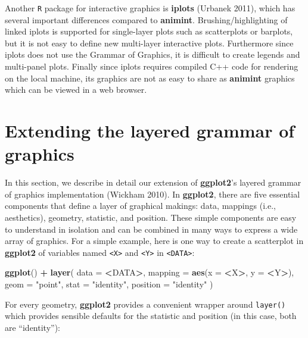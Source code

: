 \documentclass[12pt,]{article}
\newenvironment{Shaded}{\begin{snugshade}}{\end{snugshade}}
\newcommand{\DataTypeTok}[1]{\textcolor[rgb]{0.13,0.29,0.53}{#1}}
\newcommand{\KeywordTok}[1]{\textcolor[rgb]{0.13,0.29,0.53}{\textbf{#1}}}
\newcommand{\NormalTok}[1]{#1}
\newcommand{\OperatorTok}[1]{\textcolor[rgb]{0.81,0.36,0.00}{\textbf{#1}}}
\newcommand{\StringTok}[1]{\textcolor[rgb]{0.31,0.60,0.02}{#1}}
\theoremstyle{definition}
\theoremstyle{definition}
\theoremstyle{definition}
\theoremstyle{remark}
\begin{document}
Another \texttt{R} package for interactive graphics is \textbf{iplots}
(Urbanek 2011), which has several important differences compared to
\textbf{animint}. Brushing/highlighting of linked iplots is supported
for single-layer plots such as scatterplots or barplots, but it is not
easy to define new multi-layer interactive plots. Furthermore since
iplots does not use the Grammar of Graphics, it is difficult to create
legends and multi-panel plots. Finally since iplots requires compiled
C++ code for rendering on the local machine, its graphics are not as
easy to share as \textbf{animint} graphics which can be viewed in a web
browser.

\hypertarget{extending-the-layered-grammar-of-graphics}{%
\section{Extending the layered grammar of
graphics}\label{extending-the-layered-grammar-of-graphics}}

In this section, we describe in detail our extension of
\textbf{ggplot2}'s layered grammar of graphics implementation (Wickham
2010). In \textbf{ggplot2}, there are five essential components that
define a layer of graphical makings: data, mappings (i.e., aesthetics),
geometry, statistic, and position. These simple components are easy to
understand in isolation and can be combined in many ways to express a
wide array of graphics. For a simple example, here is one way to create
a scatterplot in \textbf{ggplot2} of variables named
\texttt{\textless{}X\textgreater{}} and
\texttt{\textless{}Y\textgreater{}} in
\texttt{\textless{}DATA\textgreater{}}:

\begin{Shaded}
\begin{Highlighting}[]
\KeywordTok{ggplot}\NormalTok{() }\OperatorTok{+}\StringTok{ }\KeywordTok{layer}\NormalTok{(}
  \DataTypeTok{data =} \OperatorTok{<}\NormalTok{DATA}\OperatorTok{>}\NormalTok{, }
  \DataTypeTok{mapping =} \KeywordTok{aes}\NormalTok{(}\DataTypeTok{x =} \OperatorTok{<}\NormalTok{X}\OperatorTok{>}\NormalTok{, }\DataTypeTok{y =} \OperatorTok{<}\NormalTok{Y}\OperatorTok{>}\NormalTok{), }
  \DataTypeTok{geom =} \StringTok{"point"}\NormalTok{, }
  \DataTypeTok{stat =} \StringTok{"identity"}\NormalTok{,}
  \DataTypeTok{position =} \StringTok{"identity"}
\NormalTok{)}
\end{Highlighting}
\end{Shaded}

For every geometry, \textbf{ggplot2} provides a convenient wrapper
around \texttt{layer()} which provides sensible defaults for the
statistic and position (in this case, both are ``identity''):
\end{document}
